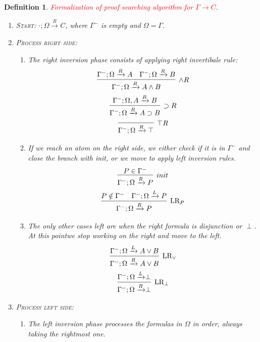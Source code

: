 \documentclass{article}
\theoremstyle{plain}
\newtheorem{definition}[theorem]{Definition}
\newcounter{case}
\theoremstyle{nonumberplain}
\newcommand{\redt}[1]{\textcolor{red}{#1}}
\begin{document}
\begin{definition}
\rm \redt{Formalization of proof searching algorithm for $\Gamma \to C$}.
\begin{enumerate}
	\item \textsc{Start}: $\cdot;\Omega \xrightarrow{R} C$, where $\Gamma^-$ is empty and $\Omega = \Gamma$. 
	\item \textsc{Process right side}: 
	\begin{enumerate}
		\item The right inversion phase consists of applying right invertibale rule:
	$$
	\begin{gathered}
	\infer[\wedge R]{\Gamma^-; \Omega \xrightarrow{R} A \wedge B}{\Gamma^-; \Omega \xrightarrow{R} A & \Gamma^-; \Omega \xrightarrow{R} B} \\
	\infer[\supset R]{\Gamma^-; \Omega \xrightarrow{R} A \supset B}{\Gamma^-; \Omega, A \xrightarrow{R} B} \\
	\infer[\top R]{\Gamma^-; \Omega \xrightarrow{R} \top}{}
	\end{gathered}
	$$
		\item If we reach an atom on the right side, we either check if it is in $\Gamma^-$ and close the branch with \emph{init}, or we move to apply left inversion rules.
		$$
		\begin{gathered}
		\infer[init]{\Gamma^-; \Omega \xrightarrow{R} P}{P \in \Gamma^-} \\
		\infer[\text{LR}_P]{\Gamma^-; \Omega \xrightarrow{R} P}{P \notin \Gamma^- & \Gamma^-; \Omega \xrightarrow{L} P}
		\end{gathered}
		$$
		\item The only other cases left are when the right formula is disjunction or $\perp$. At this pointwe stop working on the right and move to the left.
		$$
		\begin{gathered}
		\infer[\text{LR}_\vee]{\Gamma^-; \Omega \xrightarrow{R} A \vee B}{\Gamma^-; \Omega \xrightarrow{L} A \vee B} \\
		\infer[\text{LR}_\perp]{\Gamma^-; \Omega \xrightarrow{R} \perp}{\Gamma^-; \Omega \xrightarrow{L} \perp}
		\end{gathered}
		$$
	\end{enumerate}
	\item \textsc{Process left side}:
	\begin{enumerate}
		\item The left inversion phase processes the formulas in $\Omega$ in order, always taking the rightmost one. 
		$$
		\begin{gathered}

\end{gathered}$$
\end{enumerate}
\end{enumerate}
\end{definition}
\end{document}
